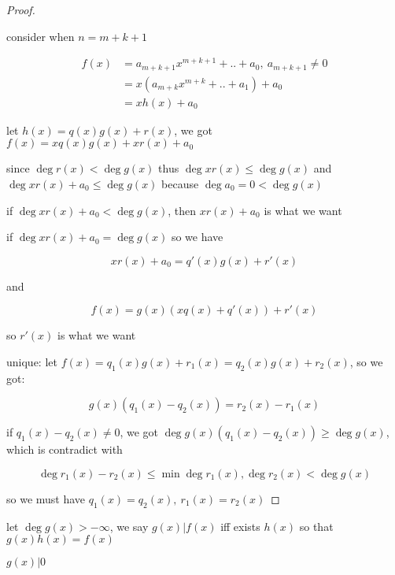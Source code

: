 \begin{proof}
\begin{enumerate}
\begin{enumerate}
            consider when $n = m + k+1$

            \begin{align*}
                f(x) &= a_{m+k+1}x^{m+k+1} + .. + a_0,\: a_{m+k+1} \ne 0 \\
                &= x(a_{m+k}x^{m+k} + .. + a_1) + a_0 \\
                &= x h(x) + a_0
            \end{align*}

            let $h(x) = q(x)g(x) + r(x)$, we got $f(x) = xq(x)g(x) + xr(x) + a_0$

            since $\deg r(x) < \deg g(x)$ thus $\deg xr(x) \le \deg g(x)$
            and $\deg xr(x) + a_0 \le \deg g(x) $ because $\deg a_0 = 0 < \deg g(x)$
            
            if $\deg xr(x) + a_0 < \deg g(x)$, then $xr(x) + a_0$ is what we want

            if $\deg xr(x) + a_0 = \deg g(x) $  so we have

            \[
                xr(x) + a_0 = q'(x)g(x) + r'(x)
            \]

            and

            \[
                f(x) = g(x)(xq(x) + q'(x)) + r'(x)
            \]

            so $r'(x)$ is what we want
        \end{enumerate}
    \end{enumerate}

unique:
    let $f(x) = q_1(x)g(x) + r_1(x) = q_2(x)g(x) + r_2(x)$, so we got:

    \[
        g(x)(q_1(x) - q_2(x)) = r_2(x) - r_1(x)
    \]

    if $q_1(x)  - q_2(x) \ne 0$, we got $\deg g(x)(q_1(x) - q_2(x)) \ge \deg g(x)$, which is contradict with

    \[
        \deg r_1(x) - r_2(x) \le \min \deg r_1(x), \deg r_2(x) < \deg g(x)
    \]

    so we must have $q_1(x) = q_2(x),\: r_1(x) = r_2(x)$

\end{proof}

\begin{definition}
    let $\deg g(x) > -\infty$, we say $g(x) | f(x)$ iff exists $h(x)$ so that $g(x)h(x) = f(x)$
\end{definition}

\begin{exercise}
    $g(x) | 0$
\end{exercise}

